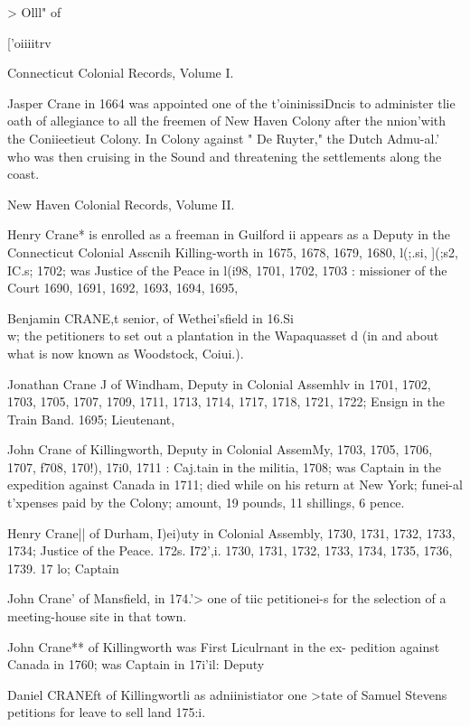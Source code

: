\documentclass{book}
\begin{document}
> Olll" of 


['oiiiitrv 




Connecticut Colonial Records, Volume I. 

Jasper Crane in 1664 was appointed one of the t'oininissiDncis 
to administer tlie oath of allegiance to all the freemen of New 
Haven Colony after the nnion'with the Coniieetieut Colony. In 
Colony against " De Ruyter," the Dutch Admu-al.' who was then 
cruising in the Sound and threatening the settlements along the 
coast. 

New Haven Colonial Records, Volume II. 

Henry Crane* is enrolled as a freeman in Guilford ii 
appears as a Deputy in the Connecticut Colonial Asscnih 
Killing-worth in 1675, 1678, 1679, 1680, l(;.si, ](;s2, IC.s; 
1702; was Justice of the Peace in l(i98, 1701, 1702, 1703 : 
missioner of the Court 1690, 1691, 1692, 1693, 1694, 1695, 

Benjamin CRANE,t senior, of Wethei'sfield in 16.Si\\ w; 
the petitioners to set out a plantation in the Wapaquasset d 
(in and about what is now known as Woodstock, Coiui.). 

Jonathan Crane J of Windham, Deputy in Colonial Assemhlv 
in 1701, 1702, 1703, 1705, 1707, 1709, 1711, 1713, 1714, 1717, 
1718, 1721, 1722; Ensign in the Train Band. 1695; Lieutenant, 

John Crane of Killingworth, Deputy in Colonial AssemMy, 
1703, 1705, 1706, 1707, f708, 170!), 17i0, 1711 : Caj.tain in the 
militia, 1708; was Captain in the expedition against Canada in 
1711; died while on his return at New York; funei-al t'xpenses 
paid by the Colony; amount, 19 pounds, 11 shillings, 6 pence. 

Henry Crane|| of Durham, I)ei)uty in Colonial Assembly, 
1730, 1731, 1732, 1733, 1734; Justice of the Peace. 172s. I72',i. 
1730, 1731, 1732, 1733, 1734, 1735, 1736, 1739. 17 lo; Captain 

John Crane' of Mansfield, in 174.'> one of tiic petitionei-s for 
the selection of a meeting-house site in that town. 

John Crane** of Killingworth was First Liculrnant in the ex- 
pedition against Canada in 1760; was Captain in 17i'il: Deputy 

Daniel CRANEft of Killingwortli as adniinistiator one >tate of 
Samuel Stevens petitions for leave to sell land 175:i. 
\end{document}
